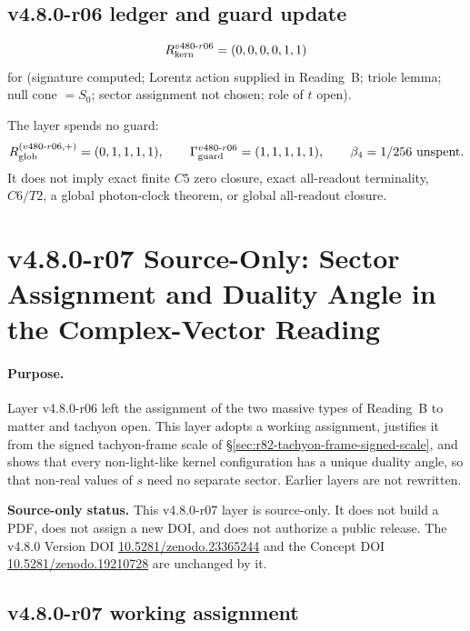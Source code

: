 \subsection*{v4.8.0-r06 ledger and guard update}
\label{subsec:v480-r06-ledger-guard}

\[
R_{\rm kern}^{v480\text{-}r06}=(0,0,0,0,1,1)
\]
for (signature computed; Lorentz action supplied in Reading~B; triole lemma; null cone \(=S_0\);
sector assignment not chosen; role of \(t\) open).

The layer spends no guard:
\[
R_{\rm glob}^{(v480\text{-}r06,+)}=(0,1,1,1,1),
\qquad
\Gamma_{\rm guard}^{v480\text{-}r06}=(1,1,1,1,1),
\qquad
\beta_4=1/256\ \text{unspent}.
\]
It does not imply exact finite \(C5\) zero closure, exact all-readout terminality,
\(C6/T2\), a global photon-clock theorem, or global all-readout closure.


\clearpage
\section*{v4.8.0-r07 Source-Only: Sector Assignment and Duality Angle in the Complex-Vector Reading}
\label{sec:v480-r07-sector-assignment}

\paragraph{Purpose.}
Layer v4.8.0-r06 left the assignment of the two massive types of Reading~B to matter and tachyon
open.  This layer adopts a working assignment, justifies it from the signed tachyon-frame scale of
\S\ref{sec:r82-tachyon-frame-signed-scale}, and shows that every non-light-like kernel configuration
has a unique duality angle, so that non-real values of \(s\) need no separate sector.  Earlier
layers are not rewritten.

\noindent\textbf{Source-only status.}
This v4.8.0-r07 layer is source-only.  It does not build a PDF, does not assign a new DOI,
and does not authorize a public release.  The v4.8.0 Version DOI
\href{https://doi.org/10.5281/zenodo.23365244}{10.5281/zenodo.23365244} and the Concept DOI
\href{https://doi.org/10.5281/zenodo.19210728}{10.5281/zenodo.19210728} are unchanged by it.

\subsection*{v4.8.0-r07 working assignment}
\label{subsec:v480-r07-assignment}

